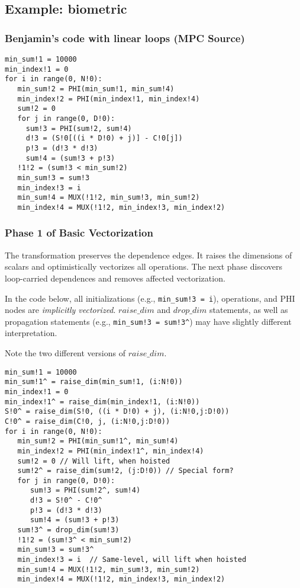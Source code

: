 
%

\subsection{Example: biometric}

\subsubsection{Benjamin's code with linear loops (MPC Source)}

{\small
\begin{verbatim}
min_sum!1 = 10000
min_index!1 = 0
for i in range(0, N!0):
   min_sum!2 = PHI(min_sum!1, min_sum!4)
   min_index!2 = PHI(min_index!1, min_index!4)
   sum!2 = 0
   for j in range(0, D!0):
     sum!3 = PHI(sum!2, sum!4)
     d!3 = (S!0[((i * D!0) + j)] - C!0[j])
     p!3 = (d!3 * d!3)
     sum!4 = (sum!3 + p!3)
   !1!2 = (sum!3 < min_sum!2)
   min_sum!3 = sum!3
   min_index!3 = i
   min_sum!4 = MUX(!1!2, min_sum!3, min_sum!2)
   min_index!4 = MUX(!1!2, min_index!3, min_index!2)
\end{verbatim}
}

\subsubsection{Phase 1 of Basic Vectorization}

The transformation preserves the dependence edges. It raises the dimensions of scalars and optimistically vectorizes all operations. 
The next phase discovers loop-carried dependences and removes affected vectorization.

In the code below, all initializations (e.g., \texttt{min\_sum!3 = i}), operations, and PHI nodes are \emph{implicitly vectorized}. 
$\mathit{raise\_dim}$ and $\mathit{drop\_dim}$ statements, as well as propagation statements (e.g., \texttt{min\_sum!3 = sum!3\^}) 
may have slightly different interpretation. 

Note the two different versions of $\mathit{raise\_dim}$. 

{\small
\begin{verbatim}
min_sum!1 = 10000
min_sum!1^ = raise_dim(min_sum!1, (i:N!0))
min_index!1 = 0
min_index!1^ = raise_dim(min_index!1, (i:N!0))
S!0^ = raise_dim(S!0, ((i * D!0) + j), (i:N!0,j:D!0))
C!0^ = raise_dim(C!0, j, (i:N!0,j:D!0))
for i in range(0, N!0):
   min_sum!2 = PHI(min_sum!1^, min_sum!4)
   min_index!2 = PHI(min_index!1^, min_index!4) 
   sum!2 = 0 // Will lift, when hoisted
   sum!2^ = raise_dim(sum!2, (j:D!0)) // Special form?
   for j in range(0, D!0):
      sum!3 = PHI(sum!2^, sum!4)
      d!3 = S!0^ - C!0^
      p!3 = (d!3 * d!3) 
      sum!4 = (sum!3 + p!3)
   sum!3^ = drop_dim(sum!3)     
   !1!2 = (sum!3^ < min_sum!2)
   min_sum!3 = sum!3^
   min_index!3 = i  // Same-level, will lift when hoisted
   min_sum!4 = MUX(!1!2, min_sum!3, min_sum!2)
   min_index!4 = MUX(!1!2, min_index!3, min_index!2)
\end{verbatim}
}

